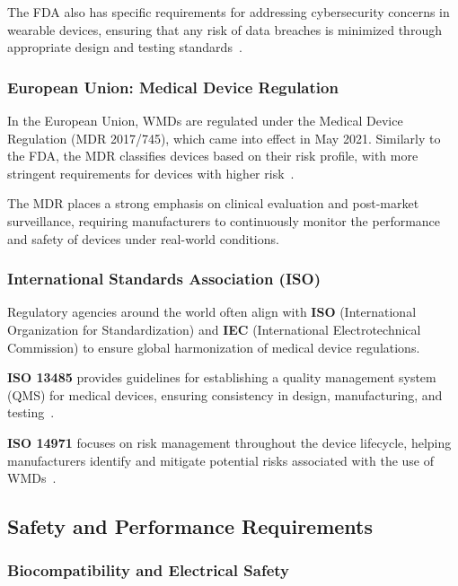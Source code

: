 \documentclass[journal]{IEEEtran}
\begin{document}
        The FDA also has specific requirements for addressing cybersecurity concerns in wearable devices, ensuring that any risk of data breaches is minimized through appropriate design and testing standards~\cite{Ravizza2019,FDA2016,FDA2023}.

        \subsubsection{European Union: Medical Device Regulation}

        In the European Union, WMDs are regulated under the Medical Device Regulation (MDR 2017/745), which came into effect in May 2021. Similarly to the FDA, the MDR classifies devices based on their risk profile, with more stringent requirements for devices with higher risk~\cite{EuropeanUnion2024}.

        The MDR places a strong emphasis on clinical evaluation and post-market surveillance, requiring manufacturers to continuously monitor the performance and safety of devices under real-world conditions.

        \subsubsection{International Standards Association (ISO)}

        Regulatory agencies around the world often align with \textbf{ISO} (International Organization for Standardization) and \textbf{IEC} (International Electrotechnical Commission) to ensure global harmonization of medical device regulations.

        \textbf{ISO 13485} provides guidelines for establishing a quality management system (QMS) for medical devices, ensuring consistency in design, manufacturing, and testing~\cite{ISO2016}.

        \textbf{ISO 14971} focuses on risk management throughout the device lifecycle, helping manufacturers identify and mitigate potential risks associated with the use of WMDs~\cite{ISO2019}.

    \subsection{Safety and Performance Requirements}

        \subsubsection{Biocompatibility and Electrical Safety}
\end{document}
